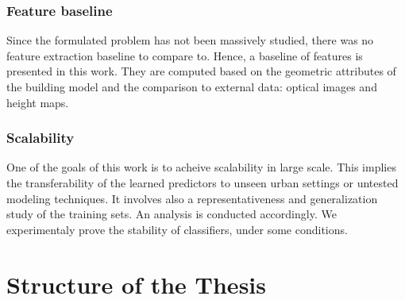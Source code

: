         \subsubsection{Feature baseline}
            Since the formulated problem has not been massively studied, there was no feature extraction baseline to compare to.
            Hence, a baseline of features is presented in this work.
            They are computed based on the geometric attributes of the building model and the comparison to external data: optical images and height maps.
        
        \subsubsection{Scalability}
            One of the goals of this work is to acheive scalability in large scale.
            This implies the transferability of the learned predictors to unseen urban settings or untested modeling techniques.
            It involves also a representativeness and generalization study of the training sets.
            An analysis is conducted accordingly.
            We experimentaly prove the stability of classifiers, under some conditions.

\section{Structure of the Thesis}
    \label{sec::introduction::structure_of_thesis}
